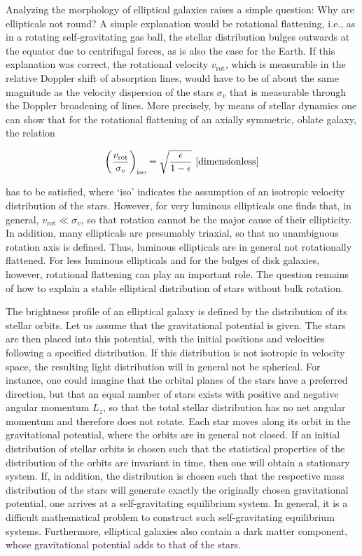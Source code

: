 \documentclass[a4paper,11pt]{article}
\begin{document}
{\noindent}Analyzing the morphology of elliptical galaxies raises a simple question: Why are ellipticals not round? A simple explanation would be rotational flattening, i.e., as in a rotating self-gravitating gas ball, the stellar distribution bulges outwards at the equator due to centrifugal forces, as is also the case for the Earth. If this explanation was correct, the rotational velocity $v_\mathrm{rot}$, which is measurable in the relative Doppler shift of absorption lines, would have to be of about the same magnitude as the velocity dispersion of the stars $\sigma_v$ that is measurable through the Doppler broadening of lines. More precisely, by means of stellar dynamics one can show that for the rotational flattening of an axially symmetric, oblate galaxy, the relation

\begin{align*}
    \left(\frac{v_\mathrm{rot}}{\sigma_v}\right)_\mathrm{iso} = \sqrt{\frac{\epsilon}{1-\epsilon}} ~ [{\rm dimensionless}]
\end{align*}

{\noindent}has to be satisfied, where `iso' indicates the assumption of an isotropic velocity distribution of the stars. However, for very luminous ellipticals one finds that, in general, $v_\mathrm{rot}\ll \sigma_v$, so that rotation cannot be the major cause of their ellipticity. In addition, many ellipticals are presumably triaxial, so that no unambiguous rotation axis is defined. Thus, luminous ellipticals are in general not rotationally flattened. For less luminous ellipticals and for the bulges of disk galaxies, however, rotational flattening can play an important role. The question remains of how to explain a stable elliptical distribution of stars without bulk rotation.

{\noindent}The brightness profile of an elliptical galaxy is defined by the distribution of its stellar orbits. Let us assume that the gravitational potential is given. The stars are then placed into this potential, with the initial positions and velocities following a specified distribution. If this distribution is not isotropic in velocity space, the resulting light distribution will in general not be spherical. For instance, one could imagine that the orbital planes of the stars have a preferred direction, but that an equal number of stars exists with positive and negative angular momentum $L_z$, so that the total stellar distribution has no net angular momentum and therefore does not rotate. Each star moves along its orbit in the gravitational potential, where the orbits are in general not closed. If an initial distribution of stellar orbits is chosen such that the statistical properties of the distribution of the orbits are invariant in time, then one will obtain a stationary system. If, in addition, the distribution is chosen such that the respective mass distribution of the stars will generate exactly the originally chosen gravitational potential, one arrives at a self-gravitating equilibrium system. In general, it is a difficult mathematical problem to construct such self-gravitating equilibrium systems. Furthermore, elliptical galaxies also contain a dark matter component, whose gravitational potential adds to that of the stars.
\end{document}
